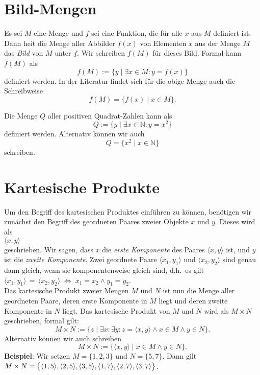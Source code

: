\section{Bild-Mengen}
Es sei $M$ eine Menge und $f$ sei eine Funktion, die f\"{u}r alle $x$ aus $M$ definiert ist.
Dann hei\3t die Menge aller Abbilder $f(x)$ von Elementen $x$ aus der Menge $M$ das
\emph{Bild} von $M$ unter $f$.  Wir schreiben $f(M)$ f\"{u}r dieses Bild.
Formal kann $f(M)$ als
 \[ f(M) := \{ y \;|\; \exists x \in M: y = f(x) \} \]
definiert werden. In der Literatur findet sich f\"{u}r die obige Menge auch die Schreibweise
\[ f(M) = \bigl\{ f(x) \;|\; x \in M \}. \]

\example
Die Menge $Q$ aller positiven Quadrat-Zahlen kann als 
\[ Q := \{ y \mid \exists x \in \mathbb{N}: y = x^2\} \]
definiert werden.  Alternativ k\"{o}nnen wir auch 
\[ Q = \bigl\{ x^2 \mid x \in \mathbb{N} \bigr\} \]
schreiben.
\eox


\section{Kartesische Produkte}
Um den Begriff des kartesischen Produktes einf\"{u}hren zu k\"{o}nnen, ben\"{o}tigen wir zun\"{a}chst den Begriff
des geordneten Paares zweier Objekte $x$ und $y$.  Dieses wird  als \\[0.2cm]
\hspace*{1.3cm} $\langle x, y \rangle$ \\[0.2cm]
geschrieben.  Wir sagen, dass $x$ die \emph{erste Komponente} des Paares $\langle x, y \rangle$ ist, 
und $y$ ist die \emph{zweite Komponente}.  Zwei geordnete Paare $\langle x_1, y_1 \rangle$ und $\langle x_2, y_2 \rangle$
sind genau dann gleich, wenn sie komponentenweise gleich sind, d.h.~es gilt \\[0.2cm]
\hspace*{1.3cm} $\langle x_1, y_1 \rangle \,=\,\langle x_2, y_2 \rangle  \;\Leftrightarrow\; x_1 = x_2 \wedge y_1 = y_2$. \\[0.2cm]
Das kartesische Produkt zweier Mengen $M$ und $N$ ist nun die Menge aller geordneten
Paare, deren erste Komponente in $M$ liegt und deren zweite Komponente in $N$ liegt.
Das kartesische Produkt von $M$ und $N$ wird als $M \times N$ geschrieben, formal gilt: 
\[ M \times N := \big\{ z \mid \exists x\colon \exists y\colon z = \langle x,y\rangle \wedge x\in M \wedge y \in N \}. \]
Alternativ k\"{o}nnen wir auch schreiben
\[ M \times N := \big\{ \langle x,y\rangle \mid  x\in M \wedge y \in N \}. \]
\noindent
\textbf{Beispiel}:  Wir setzen $M = \{ 1, 2, 3 \}$ und $N = \{ 5, 7 \}$. Dann gilt\\[0.2cm]
\hspace*{1.3cm} 
$M \times N = \bigl\{ \pair(1,5),\pair(2,5),\pair(3,5),\pair(1,7),\pair(2,7),\pair(3,7)\bigr\}$.
\vspace{0.2cm}

